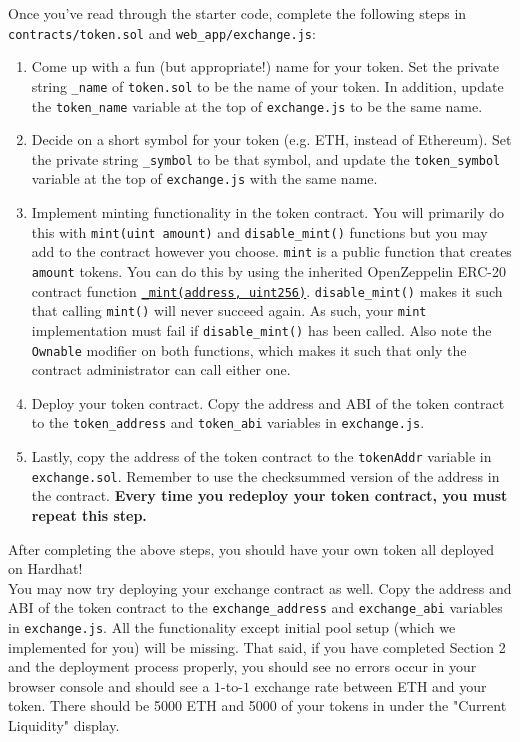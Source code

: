 \documentclass[11pt]{article}
\begin{document}
Once you've read through the starter code, complete the following steps in \verb|contracts/token.sol| and \verb|web_app/exchange.js|:
\begin{enumerate}
    \item Come up with a fun (but appropriate!) name for your token. Set the private string \verb|_name| of \verb|token.sol| to be the name of your token. In addition, update the \verb+token_name+ variable at the top of \texttt{exchange.js} to be the same name.
    
    \item Decide on a short symbol for your token (e.g. ETH, instead of Ethereum). Set the private string \verb|_symbol| to be that symbol, and update the \texttt{token\_symbol} variable at the top of \texttt{exchange.js} with the same name.
    \item Implement minting functionality in the token contract. You will primarily do this with \texttt{mint(uint amount)} and \texttt{disable\_mint()} functions but you may add to the contract however you choose. \texttt{mint} is a public function that creates \texttt{amount} tokens. You can do this by using the inherited OpenZeppelin ERC-20 contract function \href{https://docs.openzeppelin.com/contracts/2.x/api/token/erc20#ERC20-_mint-address-uint256-}{\texttt{\_mint(address, uint256)}}. \texttt{disable\_mint()} makes it such that calling \texttt{mint()} will never succeed again. As such, your \texttt{mint} implementation must fail if \texttt{disable\_mint()} has been called. Also note the \texttt{Ownable} modifier on both functions, which makes it such that only the contract administrator can call either one.
    
    \item Deploy your token contract. Copy the address and ABI of the token contract to the \texttt{token\_address} and \texttt{token\_abi} variables in \texttt{exchange.js}.
    
    \item Lastly, copy the address of the token contract to the \texttt{tokenAddr} variable in \texttt{exchange.sol}. Remember to use the checksummed version of the address in the contract. \textbf{Every time you redeploy your token contract, you must repeat this step.}
\end{enumerate}

After completing the above steps, you should have your own token all deployed on Hardhat! \\

You may now try deploying your exchange contract as well. Copy the address and ABI of the token contract to the \texttt{exchange\_address} and \texttt{exchange\_abi} variables in  \texttt{exchange.js}. All the functionality except initial pool setup (which we implemented for you) will be missing. That said, if you have completed Section 2 and the deployment process properly, you should see no errors occur in your browser console and should see a $1$-to-$1$ exchange rate between ETH and your token. There should be 5000 ETH and 5000 of your tokens in under the "Current Liquidity" display.
\end{document}
